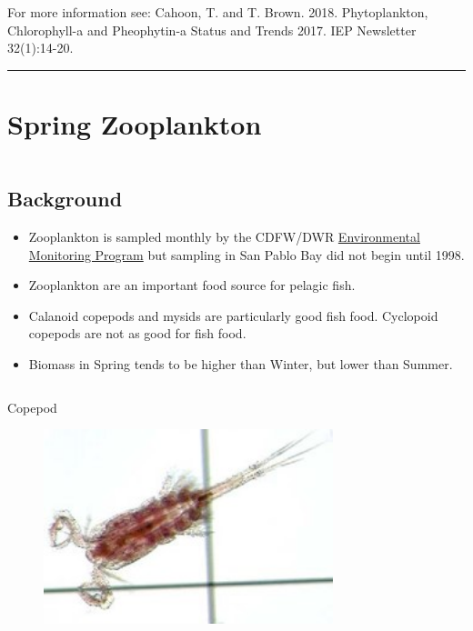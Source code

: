 \documentclass[
]{book}
\providecommand{\tightlist}{%
  \setlength{\itemsep}{0pt}\setlength{\parskip}{0pt}}
\begin{document}
\begin{disclaimer}
For more information see: Cahoon, T. and T. Brown. 2018. Phytoplankton,
Chlorophyll-a and Pheophytin-a Status and Trends 2017. IEP Newsletter
32(1):14-20.
\end{disclaimer}

\begin{center}\rule{0.5\linewidth}{0.5pt}\end{center}

\hypertarget{spring-zooplankton}{%
\section{Spring Zooplankton}\label{spring-zooplankton}}

\begin{columns-nocenter}

\begin{column}

\hypertarget{background-3}{%
\subsection{Background}\label{background-3}}

\begin{itemize}
\tightlist
\item
  Zooplankton is sampled monthly by the CDFW/DWR \href{https://emp.baydeltalive.com/wiki/12297}{Environmental Monitoring Program} but sampling in San Pablo Bay did not begin until 1998.
\item
  Zooplankton are an important food source for pelagic fish.
\item
  Calanoid copepods and mysids are particularly good fish food. Cyclopoid copepods are not as good for fish food.
\item
  Biomass in Spring tends to be higher than Winter, but lower than Summer.
\end{itemize}

\end{column}

\begin{column}

Copepod

\begin{figure}

{\centering \includegraphics[width=3.31in]{figures/copepod} 

}
\end{figure}
\end{column}
\end{columns-nocenter}
\end{document}
